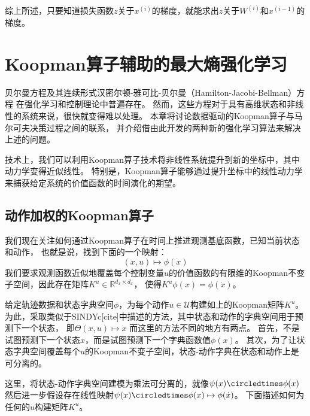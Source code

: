 \documentclass[AutoFakeBold]{LZUThesis}
\begin{document}
综上所述，只要知道损失函数$z$关于$x^{(i)}$的梯度，就能求出$z$关于$W^{(i)}$和$x^{(i - 1)}$的梯度。

\chapter{Koopman算子辅助的最大熵强化学习}

贝尔曼方程及其连续形式汉密尔顿-雅可比-贝尔曼（Hamilton-Jacobi-Bellman）方程
在强化学习和控制理论中普遍存在。
然而，这些方程对于具有高维状态和非线性的系统来说，很快就变得难以处理。
本章将讨论数据驱动的Koopman算子与马尔可夫决策过程之间的联系，
并介绍借由此开发的两种新的强化学习算法来解决上述的问题。

技术上，我们可以利用Koopman算子技术将非线性系统提升到新的坐标中，其中动力学变得近似线性。
特别是，Koopman算子能够通过提升坐标中的线性动力学来捕获给定系统的价值函数的时间演化的期望。


\section{动作加权的Koopman算子}
我们现在关注如何通过Koopman算子在时间上推进观测基底函数，已知当前状态和动作，
也就是说，找到下面的一个映射：
\begin{equation}
  (x, u) \mapsto \phi(\dot x)
\end{equation}
我们要求观测函数近似地覆盖每个控制变量$u$的价值函数的有限维的Koopman不变子空间，因此存在矩阵$K^u \in \mathbb{R}^{d_x \times d_x}$，
使得$K^u \phi(x) = \phi(\dot x)$。

给定轨迹数据和状态字典空间$\phi$，为每个动作$u \in \mathcal{U}$构建如上的Koopman矩阵$K^u$。
为此，采取类似于SINDYc[cite]中描述的方法，其中状态和动作的字典空间用于预测下一个状态，
即$\Theta(x, u) \mapsto \dot x$
而这里的方法不同的地方有两点。
首先，不是试图预测下一个状态$x$，而是试图预测下一个字典函数值$\phi(x)$。
其次，为了让状态字典空间覆盖每个$u$的Koopman不变子空间，状态-动作字典在状态和动作上是可分离的。

这里，将状态-动作字典空间建模为乘法可分离的，就像$\psi(x) \circledtimes \phi(x)$
然后进一步假设存在线性映射$\psi(x) \circledtimes \phi(x) \mapsto \phi(\dot x)$。
下面描述如何为任何的$u$构建矩阵$K^u$。
\end{document}
